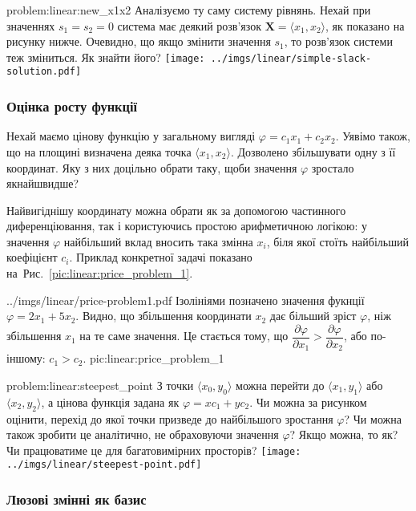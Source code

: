 \documentclass[\main/book.tex]{subfiles}
\begin{document}
\begin{problem}{problem:linear:new_x1x2}
 Аналізуємо ту саму систему рівнянь. Нехай при значеннях $s_1 = s_2 = 0$ система має деякий розв'язок $\mathbf{X} = \langle x_1, x_2 \rangle$, як показано на рисунку нижче. Очевидно, що якщо змінити значення $s_1$, то розв'язок системи теж зміниться. Як знайти його?
 \center
 \texttt{[image: ../imgs/linear/simple-slack-solution.pdf]}
\end{problem}

\subsubsection{Оцінка росту функції}
\label{section:linear:phi_increase_evaluation}

Нехай маємо цінову функцію у загальному вигляді $\varphi = c_1 x_1 + c_2 x_2$. Уявімо також, що на площині визначена деяка точка ${\langle x_1, x_2 \rangle}$. Дозволено збільшувати одну з її координат. Яку з них доцільно обрати таку, щоби значення $\varphi$ зростало якнайшвидше?

\flqq{}Найвигіднішу\frqq{} координату можна обрати як за допомогою частинного диференціювання, так і користуючись простою арифметичною логікою: у значення $\varphi$ найбільший вклад вносить така змінна $x_i$, біля якої стоїть найбільший коефіцієнт $c_i$. Приклад конкретної задачі показано на~Рис.~\ref{pic:linear:price_problem_1}.

\illustration
 {../imgs/linear/price-problem1.pdf}
 {Ізолініями позначено значення фукнції $\varphi = 2 x_1 + 5 x_2$. Видно, що збільшення координати $x_2$ дає більший зріст $\varphi$, ніж збільшення $x_1$ на те саме значення. Це стається тому, що $\dfrac{\partial\varphi}{\partial x_1} > \dfrac{\partial\varphi}{\partial x_2}$, або по-іншому: $c_1 > c_2$.}
 {pic:linear:price_problem_1}

\begin{problem}{problem:linear:steepest_point}
 З точки $\langle x_0, y_0 \rangle$ можна перейти до $\langle x_1, y_1 \rangle$ або $\langle x_2, y_2 \rangle$, а цінова функція задана як $\varphi = x c_1 + y c_2$. Чи можна за рисунком оцінити, перехід до якої точки призведе до найбільшого зростання $\varphi$? Чи можна також зробити це аналітично, не обраховуючи значення $\varphi$? Якщо можна, то як? Чи працюватиме це для багатовимірних просторів?
 \center
 \texttt{[image: ../imgs/linear/steepest-point.pdf]}
\end{problem}

\subsubsection{Люзові змінні як базис}
\end{document}

